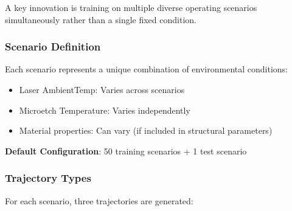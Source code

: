 \documentclass[11pt,a4paper]{article}
\begin{document}
A key innovation is training on multiple diverse operating scenarios simultaneously rather than a single fixed condition.

\subsubsection{Scenario Definition}

Each scenario represents a unique combination of environmental conditions:
\begin{itemize}
    \item Laser AmbientTemp: Varies across scenarios
    \item Microetch Temperature: Varies independently
    \item Material properties: Can vary (if included in structural parameters)
\end{itemize}

\textbf{Default Configuration}: 50 training scenarios + 1 test scenario

\subsubsection{Trajectory Types}

For each scenario, three trajectories are generated:
\end{document}
